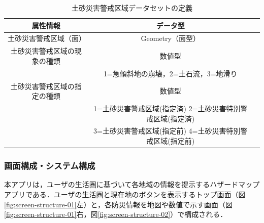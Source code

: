 \documentclass[a4paper]{jsarticle}
\begin{document}
\begin{table}[H]
  \begin{center}
    \caption{土砂災害警戒区域データセットの定義}
    \renewcommand\arraystretch{1.4}
    \begin{tabular}{|c|c|c|}
      \hline
      属性情報 & データ型 \\
      \hline
      \hline
      土砂災害警戒区域（面） & Geometry（面型） \\
      \hline
      土砂災害警戒区域の現象の種類 & 数値型 \\
      & 1=急傾斜地の崩壊，2=土石流，3=地滑り \\
      \hline
      土砂災害警戒区域の指定の種類 & 数値型 \\
      & 1=土砂災害警戒区域(指定済) 2=土砂災害特別警戒区域(指定済)　 \\
      & 3=土砂災害警戒区域(指定前) 4=土砂災害特別警戒区域(指定前) \\
      \hline
    \end{tabular}
    \label{tab:database-sediment}
  \end{center}
\end{table}

\subsubsection{画面構成・システム構成}
本アプリは，ユーザの生活圏に基づいて各地域の情報を提示するハザードマップアプリである．ユーザの生活圏と現在地のボタンを表示するトップ画面（図\ref{fig:screen-structure-01}左）と，各防災情報を地図や数値で示す画面（図\ref{fig:screen-structure-01}右，図\ref{fig:screen-structure-02}）で構成される．
\end{document}
